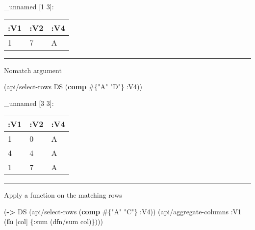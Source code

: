 \documentclass[]{article}
\newenvironment{Shaded}{\begin{snugshade}}{\end{snugshade}}
\newcommand{\KeywordTok}[1]{\textcolor[rgb]{0.13,0.29,0.53}{\textbf{#1}}}
\newcommand{\StringTok}[1]{\textcolor[rgb]{0.31,0.60,0.02}{#1}}
\newcommand{\VariableTok}[1]{\textcolor[rgb]{0.00,0.00,0.00}{#1}}
\newcommand{\AttributeTok}[1]{\textcolor[rgb]{0.77,0.63,0.00}{#1}}
\newcommand{\NormalTok}[1]{#1}
\begin{document}
\begin{Shaded}
\end{Shaded}

\_unnamed {[}1 3{]}:

\begin{longtable}[]{@{}lll@{}}
\toprule
:V1 & :V2 & :V4\tabularnewline
\midrule
\endhead
1 & 7 & A\tabularnewline
\bottomrule
\end{longtable}

\begin{center}\rule{0.5\linewidth}{0.5pt}\end{center}

Nomatch argument

\begin{Shaded}
\begin{Highlighting}[]
\NormalTok{(api/select-rows DS (}\KeywordTok{comp}\NormalTok{ #\{}\StringTok{"A"} \StringTok{"D"}\NormalTok{\} }\AttributeTok{:V4}\NormalTok{))}
\end{Highlighting}
\end{Shaded}

\_unnamed {[}3 3{]}:

\begin{longtable}[]{@{}lll@{}}
\toprule
:V1 & :V2 & :V4\tabularnewline
\midrule
\endhead
1 & 0 & A\tabularnewline
4 & 4 & A\tabularnewline
1 & 7 & A\tabularnewline
\bottomrule
\end{longtable}

\begin{center}\rule{0.5\linewidth}{0.5pt}\end{center}

Apply a function on the matching rows

\begin{Shaded}
\begin{Highlighting}[]
\NormalTok{(}\KeywordTok{->}\NormalTok{ DS}
\NormalTok{    (api/select-rows (}\KeywordTok{comp}\NormalTok{ #\{}\StringTok{"A"} \StringTok{"C"}\NormalTok{\} }\AttributeTok{:V4}\NormalTok{))}
\NormalTok{    (api/aggregate-columns }\AttributeTok{:V1}\NormalTok{ (}\KeywordTok{fn}\NormalTok{ [col]}
\NormalTok{                                 \{}\AttributeTok{:sum}\NormalTok{ (dfn/sum col)\})))}
\end{Highlighting}
\end{Shaded}
\end{document}
